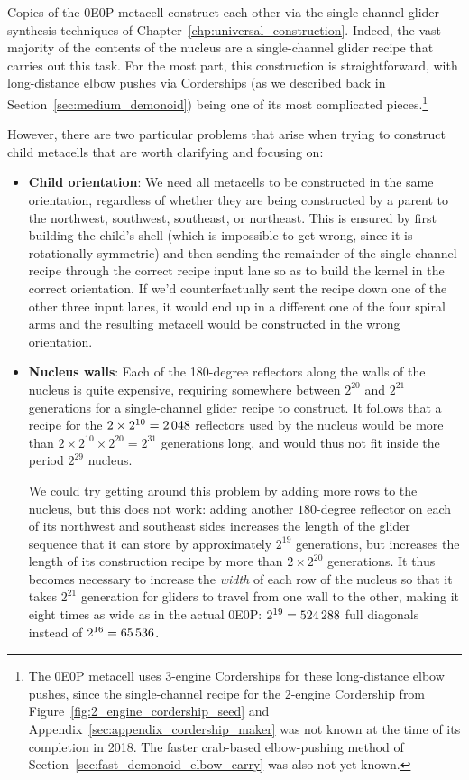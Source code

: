 Copies of the 0E0P metacell construct each other via the single-channel glider synthesis techniques of Chapter~\ref{chp:universal_construction}. Indeed, the vast majority of the contents of the nucleus are a single-channel glider recipe that carries out this task. For the most part, this construction is straightforward, with long-distance elbow pushes via Corderships (as we described back in Section~\ref{sec:medium_demonoid}) being one of its most complicated pieces.\footnote{The 0E0P metacell uses 3-engine Corderships for these long-distance elbow pushes, since the single-channel recipe for the 2-engine Cordership from Figure~\ref{fig:2_engine_cordership_seed} and Appendix~\ref{sec:appendix_cordership_maker} was not known at the time of its completion in 2018. The faster crab-based elbow-pushing method of Section~\ref{sec:fast_demonoid_elbow_carry} was also not yet known.}

However, there are two particular problems that arise when trying to construct child metacells that are worth clarifying and focusing on:\smallskip

\begin{itemize}
	\item \textbf{Child orientation}: We need all metacells to be constructed in the same orientation, regardless of whether they are being constructed by a parent to the northwest, southwest, southeast, or northeast. This is ensured by first building the child's shell (which is impossible to get wrong, since it is rotationally symmetric) and then sending the remainder of the single-channel recipe through the correct recipe input lane so as to build the kernel in the correct orientation. If we'd counterfactually sent the recipe down one of the other three input lanes, it would end up in a different one of the four spiral arms and the resulting metacell would be constructed in the wrong orientation.\smallskip
	
	\item \textbf{Nucleus walls}: Each of the 180-degree reflectors along the walls of the nucleus is quite expensive, requiring somewhere between $2^{20}$ and $2^{21}$ generations for a single-channel glider recipe to construct. It follows that a recipe for the $2 \times 2^{10} = 2{\,}048$ reflectors used by the nucleus would be more than $2 \times 2^{10} \times 2^{20} = 2^{31}$ generations long, and would thus not fit inside the period $2^{29}$ nucleus.
	
	We could try getting around this problem by adding more rows to the nucleus, but this does not work: adding another $180$-degree reflector on each of its northwest and southeast sides increases the length of the glider sequence that it can store by approximately $2^{19}$ generations, but increases the length of its construction recipe by more than $2 \times 2^{20}$ generations. It thus becomes necessary to increase the \emph{width} of each row of the nucleus so that it takes $2^{21}$ generation for gliders to travel from one wall to the other, making it eight times as wide as in the actual 0E0P: $2^{19} = 524{\,}288$ full diagonals instead of $2^{16} = 65{\,}536$.\smallskip
\end{itemize}


